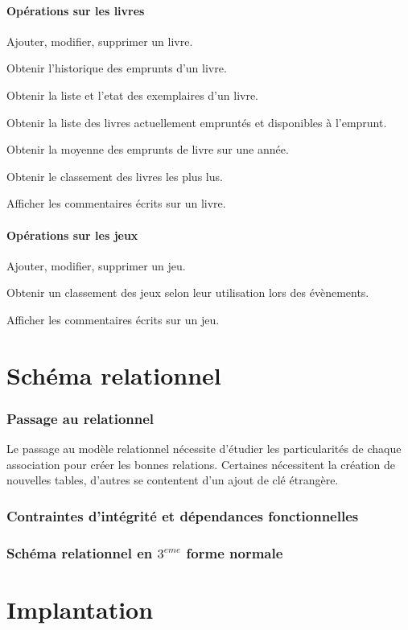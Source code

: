 \documentclass[a4paper, 11pt]{article}
\begin{document}
\subsection{Opérations sur les livres}
\item Ajouter, modifier, supprimer un livre.
\item Obtenir l'historique des emprunts d'un livre.
\item Obtenir la liste et l'etat des exemplaires d'un livre.
\item Obtenir la liste des livres actuellement empruntés et disponibles à l'emprunt.
\item Obtenir la moyenne des emprunts de livre sur une année.
\item Obtenir le classement des livres les plus lus.
\item Afficher les commentaires écrits sur un livre.
\subsection{Opérations sur les jeux}
\item Ajouter, modifier, supprimer un jeu.
\item Obtenir un classement des jeux selon leur utilisation lors des évènements.
\item Afficher les commentaires écrits sur un jeu.

\newpage
\part{Schéma relationnel}
\setcounter{section}{0}
\section{Passage au relationnel}
Le passage au modèle relationnel nécessite d'étudier les particularités de chaque association pour créer les bonnes relations. Certaines nécessitent la création de nouvelles tables, d'autres se contentent d'un ajout de clé étrangère.
\section{Contraintes d'intégrité et dépendances fonctionnelles}
\section{Schéma relationnel en $3^{eme}$ forme normale}
\newpage
\part{Implantation}
\setcounter{section}{0}
\end{document}
